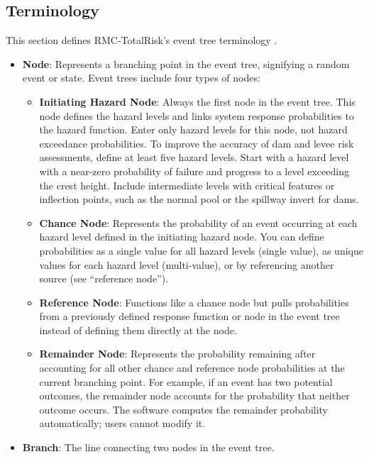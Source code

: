 \documentclass[
]{book}
\begin{document}
\hypertarget{terminology}{%
\subsection{Terminology}\label{terminology}}

This section defines RMC-TotalRisk's event tree terminology \citep{cite-TechRef}.

\begin{itemize}
\item
  \textbf{Node}: Represents a branching point in the event tree, signifying a random event or state. Event trees include four types of nodes:

  \begin{itemize}
  \item
    \textbf{Initiating Hazard Node}: Always the first node in the event tree. This node defines the hazard levels and links system response probabilities to the hazard function. Enter only hazard levels for this node, not hazard exceedance probabilities. To improve the accuracy of dam and levee risk assessments, define at least five hazard levels. Start with a hazard level with a near-zero probability of failure and progress to a level exceeding the crest height. Include intermediate levels with critical features or inflection points, such as the normal pool or the spillway invert for dams.
  \item
    \textbf{Chance Node}: Represents the probability of an event occurring at each hazard level defined in the initiating hazard node. You can define probabilities as a single value for all hazard levels (single value), as unique values for each hazard level (multi-value), or by referencing another source (see ``reference node'').
  \item
    \textbf{Reference Node}: Functions like a chance node but pulls probabilities from a previously defined response function or node in the event tree instead of defining them directly at the node.
  \item
    \textbf{Remainder Node}: Represents the probability remaining after accounting for all other chance and reference node probabilities at the current branching point. For example, if an event has two potential outcomes, the remainder node accounts for the probability that neither outcome occurs. The software computes the remainder probability automatically; users cannot modify it.
  \end{itemize}
\item
  \textbf{Branch}: The line connecting two nodes in the event tree.

\end{itemize}
\end{document}
